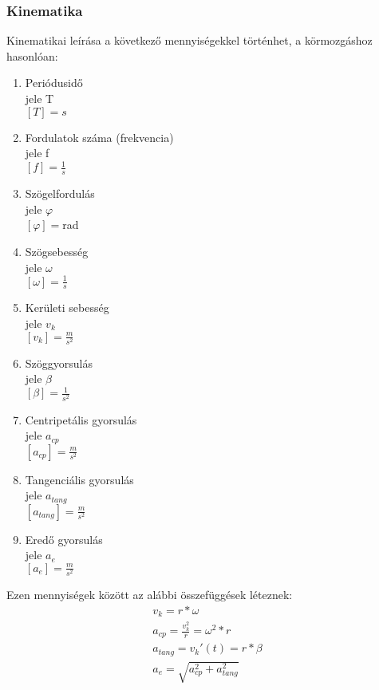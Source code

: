 \documentclass[twoside]{article}
\begin{document}
		\subsubsection{Kinematika}
			Kinematikai leírása a következő mennyiségekkel történhet, a körmozgáshoz hasonlóan:
			\begin{enumerate}
				\item Periódusidő\\
					jele T\\
					$[T]=s$
				\item Fordulatok száma (frekvencia)\\
					jele f\\
					$[f]=\frac{1}{s}$
				\item Szögelfordulás\\
					jele $\varphi$\\
					$[\varphi]=$rad
				\item Szögsebesség\\
					jele $\omega$\\
					$[\omega]=\frac{1}{s}$
				\item Kerületi sebesség\\
					jele $v_k$\\
					$[v_k]=\frac{m}{s^2}$
				\item Szöggyorsulás\\
					jele $\beta$\\
					$[\beta]=\frac{1}{s^2}$
				\item Centripetális gyorsulás\\
					jele $a_{cp}$\\
					$[a_{cp}]=\frac{m}{s^2}$
				\item Tangenciális gyorsulás\\
				 	jele $a_{tang}$\\
				 	$[a_{tang}]=\frac{m}{s^2}$
			 	\item Eredő gyorsulás\\
			 		jele $a_e$\\
			 		$[a_e]=\frac{m}{s^2}$
			\end{enumerate}
			\pagebreak
			Ezen mennyiségek között az alábbi összefüggések léteznek:
			\begin{gather}
				v_k=r*\omega\label{eq:3}\\
				a_{cp}=\frac{v_k^2}{r}=\omega^2*r\label{eq:4}\\
				a_{tang}=v_k'(t)=r*\beta\label{eq:5}\\
				a_e=\sqrt{a_{cp}^2+a_{tang}^2}\label{eq:6}
			\end{gather}
\end{document}
